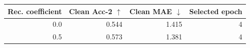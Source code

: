 \begin{tabular}{rrrr}
\toprule
Rec. coefficient & Clean Acc-2 $\uparrow$ & Clean MAE $\downarrow$ & Selected epoch \\
\midrule
0.0 & 0.544 & 1.415 & 4 \\
0.5 & 0.573 & 1.381 & 4 \\
\bottomrule
\end{tabular}

